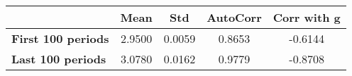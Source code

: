 \begin{tiny}\begin{tabular}{|l|c|c|c|c|}
\hline
&\textbf{Mean}&\textbf{Std}&\textbf{AutoCorr}&\textbf{Corr with g}\\\hline
\textbf{First 100 periods}&2.9500&0.0059&0.8653&-0.6144\\\hline
\textbf{Last 100 periods}&3.0780&0.0162&0.9779&-0.8708\\\hline
\end{tabular}
\end{tiny}